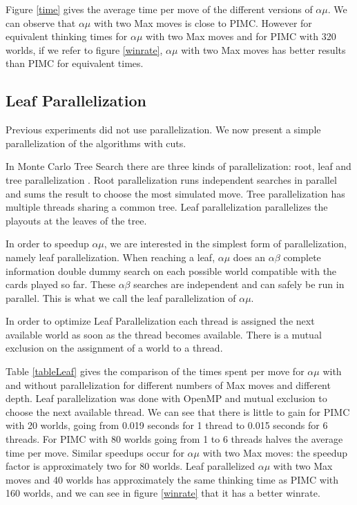 \documentclass[letterpaper]{article} %
\begin{document}
Figure \ref{time} gives the average time per move of the different versions of $\alpha\mu$. We can observe that $\alpha\mu$ with two Max moves is close to PIMC. However for equivalent thinking times for $\alpha\mu$ with two Max moves and for PIMC with 320 worlds, if we refer to figure \ref{winrate}, $\alpha\mu$ with two Max moves has better results than PIMC for equivalent times.

\subsection{Leaf Parallelization}

Previous experiments did not use parallelization. We now present a simple parallelization of the algorithms with cuts.

In Monte Carlo Tree Search there are three kinds of parallelization: root, leaf and tree parallelization \cite{cazenave2007parallelization,chaslot2008parallel,CazenaveJ08}. Root parallelization runs independent searches in parallel and sums the result to choose the most simulated move. Tree parallelization has multiple threads sharing a common tree. Leaf parallelization parallelizes the playouts at the leaves of the tree.

In order to speedup $\alpha\mu$, we are interested in the simplest form of parallelization, namely leaf parallelization. When reaching a leaf, $\alpha\mu$ does an $\alpha\beta$ complete information double dummy search on each possible world compatible with the cards played so far. These $\alpha\beta$ searches are independent and can safely be run in parallel. This is what we call the leaf parallelization of $\alpha\mu$.

In order to optimize Leaf Parallelization each thread is assigned the next available world as soon as the thread becomes available. There is a mutual exclusion on the assignment of a world to a thread.

Table \ref{tableLeaf} gives the comparison of the times spent per move for $\alpha\mu$ with and without parallelization for different numbers of Max moves and different depth. Leaf parallelization was done with OpenMP and mutual exclusion to choose the next available thread. We can see that there is little to gain for PIMC with 20 worlds, going from 0.019 seconds for 1 thread to 0.015 seconds for 6 threads. For PIMC with 80 worlds going from 1 to 6 threads halves the average time per move. Similar speedups occur for $\alpha\mu$ with two Max moves: the speedup factor is approximately two for 80 worlds. Leaf parallelized $\alpha\mu$ with two Max moves and 40 worlds has approximately the same thinking time as PIMC with 160 worlds, and we can see in figure \ref{winrate} that it has a better winrate.
\end{document}
